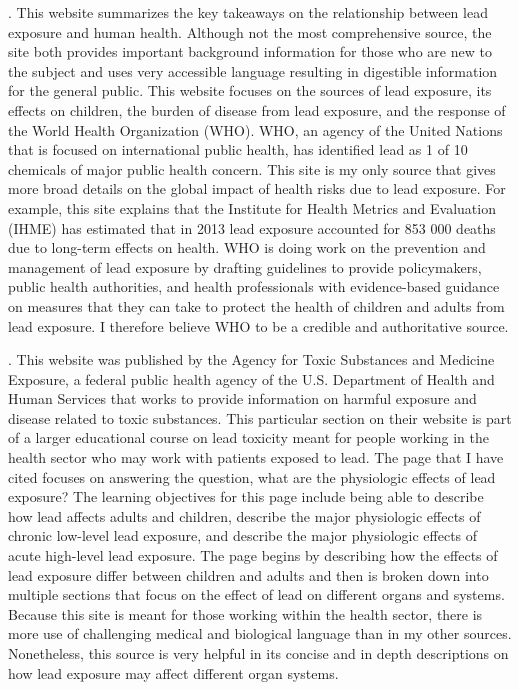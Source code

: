 \documentclass{article}\usepackage[]{graphicx}\usepackage[]{color}
\begin{document}
. 
\bigskip
This website summarizes the key takeaways on the relationship between lead exposure and human health. Although not the most comprehensive source, the site both provides important background information for those who are new to the subject and uses very accessible language resulting in digestible information for the general public. This website focuses on the sources of lead exposure, its effects on children, the burden of disease from lead exposure, and the response of the World Health Organization (WHO). WHO, an agency of the United Nations that is focused on international public health, has identified lead as 1 of 10 chemicals of major public health concern. This site is my only source that gives more broad details on the global impact of health risks due to lead exposure. For example, this site explains that the Institute for Health Metrics and Evaluation (IHME) has estimated that in 2013 lead exposure accounted for 853 000 deaths due to long-term effects on health. WHO is doing work on the prevention and management of lead exposure by drafting guidelines to provide policymakers, public health authorities, and health professionals with evidence-based guidance on measures that they can take to protect the health of children and adults from lead exposure. I therefore believe WHO to be a credible and authoritative source. 



. 
\bigskip
This website was published by the Agency for Toxic Substances and Medicine Exposure, a federal public health agency of the U.S. Department of Health and Human Services that works to provide information on harmful exposure and disease related to toxic substances. This particular section on their website is part of a larger educational course on lead toxicity meant for people working in the health sector who may work with patients exposed to lead. The page that I have cited focuses on answering the question, what are the physiologic effects of lead exposure? The learning objectives for this page include being able to describe how lead affects adults and children, describe the major physiologic effects of chronic low-level lead exposure, and describe the major physiologic effects of acute high-level lead exposure. The page begins by describing how the effects of lead exposure differ between children and adults and then is broken down into multiple sections that focus on the effect of lead on different organs and systems. Because this site is meant for those working within the health sector, there is more use of challenging medical and biological language than in my other sources. Nonetheless, this source is very helpful in its concise and in depth descriptions on how lead exposure may affect different organ systems. 
\end{document}
